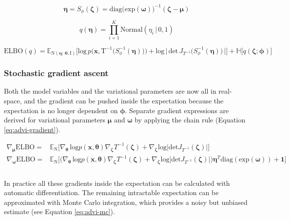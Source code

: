 \begin{equation}
    \label{eq:advi-elliptical}
    \bm{\eta} = S_{\phi}(\bm{\zeta}) = \mathrm{diag} \big( \mathrm{exp}(\bm{\omega}) \big)^{-1} (\bm{\zeta} - \bm{\mu})
\end{equation}

\begin{equation}
    \label{eq:advi-var-trans}
    q(\bm{\eta}) = \prod^K_{i=1}\mathrm{Normal}(\eta_i \, | \, 0, 1)
\end{equation}

\begin{equation} \label{eq:advi-elbo-trans}
    \mathrm{ELBO}(q) = \mathbb{E}_{\mathrm{N}(\bm{\eta}; \, \bm{0}, \bm{\mathrm{I}})} \Big[ \mathrm{log} \, p \Big( \bm{x}, \mathrm{T}^{-1} \big( S^{-1}_{\phi} ( \bm{\eta}) \big) \Big) + \mathrm{log} \, \big| \, \mathrm{det} \, J_{T^{-1}} \big( S^{-1}_{\phi} ( \bm{\eta}) \big) \, \big| \Big] + \mathbb{H} \big[ q(\bm{\zeta}; \bm{\phi}) \big]
\end{equation}


\subsubsection{Stochastic gradient ascent}
Both the model variables and the variational parameters are now all in real-space, and the gradient can be pushed inside the expectation because the expectation is no longer dependent on $\bm{\phi}$. Separate gradient expressions are derived for variational parameters $\bm{\mu}$ and $\bm{\omega}$ by applying the chain rule (Equation \ref{eq:advi-gradient}).

\begin{equation}
    \label{eq:advi-gradient}
    \begin{split}
    \nabla_{\bm{\mu}} \mathrm{ELBO} = & \mathbb{E}_{\mathrm{N}} 
    \Big[ 
        \nabla_{\bm{\theta}} \, \mathrm{log} p(\bm{x}, \bm{\theta}) \nabla_{\bm{\zeta}}T^{-1}(\bm{\zeta}) + \nabla_{\bm{\zeta}} \mathrm{log} \big| \mathrm{det} J_{T^{-1}}(\bm{\zeta}) \big| 
    \Big] \\
    \nabla_{\bm{\omega}} \mathrm{ELBO} = & \mathbb{E}_{\mathrm{N}} 
    \Big[ 
        \Big( \nabla_{\bm{\theta}} \, \mathrm{log} p(\bm{x}, \bm{\theta}) \nabla_{\bm{\zeta}}T^{-1}(\bm{\zeta}) + \nabla_{\bm{\zeta}} \mathrm{log} \big| \mathrm{det} J_{T^{-1}}(\bm{\zeta}) \big| \Big) \bm{\eta}^T \mathrm{diag(exp(\bm{\omega}))} + \bm{1}
    \Big] \\
    \end{split}
\end{equation}
\\
In practice all these gradients inside the expectation can be calculated with automatic differentiation. The remaining intractable expectation can be approximated with Monte Carlo integration, which provides a noisy but unbiased estimate (see Equation \ref{eq:advi-mc}).

